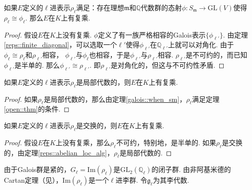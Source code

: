 \begin{cthm}
    如果$E$定义的$\ell$进表示$\rho_{\ell}$满足：存在理想$\mathfrak{m}$和$\mathbb{Q}$代数群的态射$\phi: S_{\mathfrak{m}}\to \mathrm{GL}(V)$使得$\rho_{\ell} \cong \phi_{\ell}$. 那么$E$在$K$上有复乘.\label{open::thm}
\end{cthm}

\begin{proof}
    假设$E$在$K$上没有复乘.
    $\phi$定义了有一族严格相容的Galois表示$\{\phi_{\ell'}\}$.
    由定理\ref{reps::finite_diagonal}，可以选取一个$\ell'$使得$\phi_{\ell'}$在$\mathbb{Q}_{\ell'}$上就可以对角化. 
    由于$\phi_{\ell}\cong\rho_{\ell}$和$\rho_{\ell'}$相容，
    $\phi_{\ell'}$与$\phi_{\ell}$也相容，于是$\phi_{\ell'}$与$\rho_{\ell'}$相容.
    $\rho_{\ell'}$是不可约的，而已知$\phi_{\ell'}$是半单的. 那么$\phi_{\ell'}\cong \rho_{\ell'}$.
    即$\rho_{\ell'}$是对角化的，但这与不可约性矛盾.
\end{proof}

\begin{ccor}
    如果$E$定义的$\ell$进表示$\rho_{\ell}$是局部代数的，则$E$在$K$上有复乘. \label{reps::when_cm}
\end{ccor}

\begin{proof}
    如果$\rho_{\ell}$是局部代数的，那么由定理\ref{galois::when_sm}，$\rho_{\ell}$满足定理\ref{open::thm}的条件.
\end{proof}

\begin{ccor}
    如果$E$定义的$\ell$进表示$\rho_{\ell}$是交换的，则$E$在$K$上有复乘.
\end{ccor}

\begin{proof}
    假设$E$在$K$上没有复乘，那么$\rho_{\ell}$不可约，特别地，是半单的.
    如果$\rho_{\ell}$是交换的，由定理\ref{reps::abelian_loc_alg}，$\rho_{\ell}$是局部代数的.
\end{proof}

由于Galois群是紧的，$G_{\ell} = \mathrm{Im}(\rho_\ell)$是$\mathrm{GL}_2(\mathbb{Q}_{\ell})$的闭子群. 由非阿基米德的Cartan定理（见{\parencite[][p. 155]{serre2009lie}}），$\mathrm{Im}(\rho_{\ell})$是一个$\ell$进李群. 令$\mathfrak{g}_{\ell}$为其李代数.

